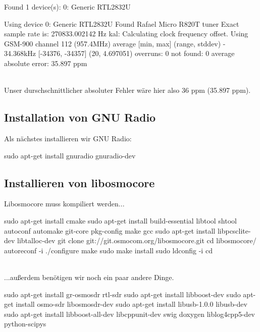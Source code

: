 \begin{code}
Found 1 device(s):
  0:  Generic RTL2832U

Using device 0: Generic RTL2832U
Found Rafael Micro R820T tuner
Exact sample rate is: 270833.002142 Hz
kal: Calculating clock frequency offset.
Using GSM-900 channel 112 (957.4MHz)
average		[min, max]	(range, stddev)
- 34.368kHz		[-34376, -34357]	(20, 4.697051)
overruns: 0
not found: 0
average absolute error: 35.897 ppm
\end{code}

\noindent\\Unser durschschnittlicher absoluter Fehler wäre hier also 36 ppm (35.897 ppm).

\subsection{Installation von GNU Radio}

Als nächstes installieren wir GNU Radio:

\begin{code}
sudo apt-get install gnuradio gnuradio-dev
\end{code}

\subsection{Installieren von libosmocore}

Libosmocore muss kompiliert werden...

\begin{code}[numbers=left, stepnumber=1]
sudo apt-get install cmake
sudo apt-get install build-essential libtool shtool autoconf automake git-core pkg-config make gcc
sudo apt-get install libpcsclite-dev libtalloc-dev
git clone git://git.osmocom.org/libosmocore.git
cd libosmocore/
autoreconf -i
./configure
make
sudo make install
sudo ldconfig -i
cd
\end{code}

\noindent\\...außerdem benötigen wir noch ein paar andere Dinge.

\begin{code}[numbers=left, stepnumber=1]
sudo apt-get install gr-osmosdr rtl-sdr
sudo apt-get install libboost-dev
sudo apt-get install osmo-sdr libosmosdr-dev
sudo apt-get install libusb-1.0.0 libusb-dev
sudo apt-get install libboost-all-dev libcppunit-dev swig doxygen liblog4cpp5-dev python-scipys
\end{code}


